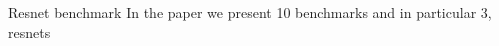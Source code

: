 \documentclass[unknownkeysallowed]{beamer}
\begin{document}
\begin{frame}{Resnet benchmark}
    In the paper we present 10 benchmarks and in particular 3, resnets
\end{frame}










\end{document}
